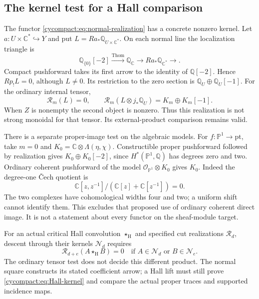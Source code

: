 \subsection{The kernel test for a Hall comparison}

The functor \eqref{cycompact:eq:normal-realization}
has a concrete nonzero kernel. Let
$a:U\times\mathbb C^*\hookrightarrow Y$ and put
$L=Ra_*\mathbb Q_{U\times\mathbb C^*}$.
On each normal line the localization triangle is
\[
 \mathbb Q_{\{0\}}[-2]\xrightarrow{\mathrm{Thom}}
 \mathbb Q_{\mathbb C}\longrightarrow
 Ra_*\mathbb Q_{\mathbb C^*}\longrightarrow.
\]
Compact pushforward takes its first arrow to the
identity of $\mathbb Q[-2]$. Hence $Rp_!L=0$,
although $L\ne0$. Its restriction to the zero
section is $\mathbb Q_U\oplus\mathbb Q_U[-1]$.
For the ordinary internal tensor,
\begin{equation}\label{cycompact:eq:normal-tensor-test}
 \mathcal R_m(L)=0,\qquad
 \mathcal R_m(L\otimes j_*\mathbb Q_U)
 =K_m\oplus K_m[-1].
\end{equation}
When $Z$ is nonempty the second object is nonzero.
Thus this realization is not strong monoidal for
that tensor. Its external-product comparison
remains valid.

There is a separate proper-image test on the
algebraic models. For $f:\mathbb P^1\to\mathrm{pt}$,
take $m=0$ and $K_0=\mathbb C\otimes\Lambda(\eta,\chi)$.
Constructible proper pushforward followed by
realization gives $K_0\oplus K_0[-2]$, since
$H^*(\mathbb P^1,\mathbb Q)$ has degrees zero
and two. Ordinary coherent pushforward of the
model $\mathcal O_{\mathbb P^1}\otimes K_0$
gives $K_0$. Indeed the degree-one \v{C}ech
quotient is
\[
 \mathbb C[z,z^{-1}]/
       (\mathbb C[z]+\mathbb C[z^{-1}])=0.
\]
The two complexes have cohomological widths four
and two; a uniform shift cannot identify them.
This excludes that proposed use of ordinary
coherent direct image. It is not a statement
about every functor on the sheaf-module target.

For an actual critical Hall convolution
$\star_{\mathrm H}$ and specified cut realizations
$\mathcal R_d$, descent through their kernels
$\mathcal N_d$ requires
\begin{equation}\label{cycompact:eq:Hall-kernel}
 \mathcal R_{d+e}(A\star_{\mathrm H}B)=0
 \quad\text{if }A\in\mathcal N_d\text{ or }B\in\mathcal N_e.
\end{equation}
The ordinary tensor test does not decide this
different product. The normal square constructs
its stated coefficient arrow; a Hall lift must
still prove \eqref{cycompact:eq:Hall-kernel} and
compare the actual proper traces and supported
incidence maps.

